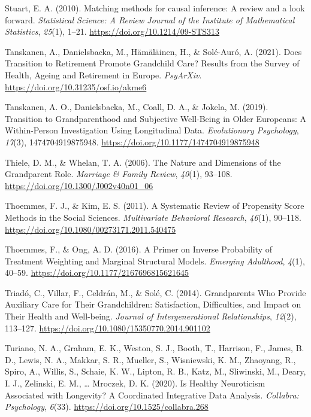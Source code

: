 \documentclass[
  english,
  man, noextraspace]{apa7}
\begin{document}
\leavevmode\hypertarget{ref-stuartMatchingMethodsCausal2010}{}%
Stuart, E. A. (2010). Matching methods for causal inference: A review and a look forward. \emph{Statistical Science: A Review Journal of the Institute of Mathematical Statistics}, \emph{25}(1), 1--21. \url{https://doi.org/10.1214/09-STS313}

\leavevmode\hypertarget{ref-tanskanenDoesTransitionRetirement2021}{}%
Tanskanen, A., Danielsbacka, M., Hämäläinen, H., \& Solé-Auró, A. (2021). Does Transition to Retirement Promote Grandchild Care? Results from the Survey of Health, Ageing and Retirement in Europe. \emph{PsyArXiv}. \url{https://doi.org/10.31235/osf.io/akme6}

\leavevmode\hypertarget{ref-tanskanenTransitionGrandparenthoodSubjective2019}{}%
Tanskanen, A. O., Danielsbacka, M., Coall, D. A., \& Jokela, M. (2019). Transition to Grandparenthood and Subjective Well-Being in Older Europeans: A Within-Person Investigation Using Longitudinal Data. \emph{Evolutionary Psychology}, \emph{17}(3), 1474704919875948. \url{https://doi.org/10.1177/1474704919875948}

\leavevmode\hypertarget{ref-thieleNatureDimensionsGrandparent2006a}{}%
Thiele, D. M., \& Whelan, T. A. (2006). The Nature and Dimensions of the Grandparent Role. \emph{Marriage \& Family Review}, \emph{40}(1), 93--108. \url{https://doi.org/10.1300/J002v40n01_06}

\leavevmode\hypertarget{ref-thoemmesSystematicReviewPropensity2011}{}%
Thoemmes, F. J., \& Kim, E. S. (2011). A Systematic Review of Propensity Score Methods in the Social Sciences. \emph{Multivariate Behavioral Research}, \emph{46}(1), 90--118. \url{https://doi.org/10.1080/00273171.2011.540475}

\leavevmode\hypertarget{ref-thoemmesPrimerInverseProbability2016}{}%
Thoemmes, F., \& Ong, A. D. (2016). A Primer on Inverse Probability of Treatment Weighting and Marginal Structural Models. \emph{Emerging Adulthood}, \emph{4}(1), 40--59. \url{https://doi.org/10.1177/2167696815621645}

\leavevmode\hypertarget{ref-triadoGrandparentsWhoProvide2014}{}%
Triadó, C., Villar, F., Celdrán, M., \& Solé, C. (2014). Grandparents Who Provide Auxiliary Care for Their Grandchildren: Satisfaction, Difficulties, and Impact on Their Health and Well-being. \emph{Journal of Intergenerational Relationships}, \emph{12}(2), 113--127. \url{https://doi.org/10.1080/15350770.2014.901102}

\leavevmode\hypertarget{ref-turianoHealthyNeuroticismAssociated2020}{}%
Turiano, N. A., Graham, E. K., Weston, S. J., Booth, T., Harrison, F., James, B. D., Lewis, N. A., Makkar, S. R., Mueller, S., Wisniewski, K. M., Zhaoyang, R., Spiro, A., Willis, S., Schaie, K. W., Lipton, R. B., Katz, M., Sliwinski, M., Deary, I. J., Zelinski, E. M., \ldots{} Mroczek, D. K. (2020). Is Healthy Neuroticism Associated with Longevity? A Coordinated Integrative Data Analysis. \emph{Collabra: Psychology}, \emph{6}(33). \url{https://doi.org/10.1525/collabra.268}
\end{document}
